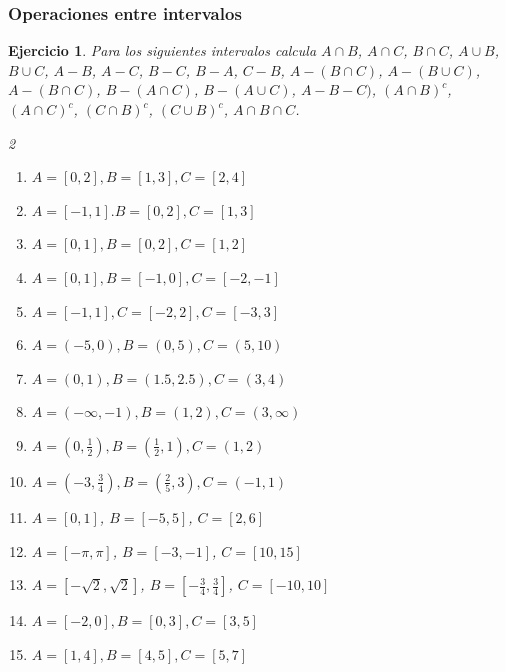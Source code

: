 \documentclass[12pt,twoside]{article}
\newtheorem{Ejer}{Ejercicio}
\begin{document}
\subsubsection*{Operaciones entre intervalos}
\begin{Ejer}
Para los siguientes intervalos calcula $A\cap B$, $A\cap C$, $B\cap C$, $A\cup B$, $B\cup C$, $A-B$, $A-C$, $B-C$, $B-A$, $C-B$, $A-(B\cap C)$, $A-(B\cup C)$, $A-(B\cap C)$, $B-(A\cap C)$, $B-(A\cup C)$, $A-B-C)$, $(A\cap B)^{c}$, $(A\cap C)^{c}$, $(C\cap B)^{c}$, $(C\cup B)^{c}$, $A\cap B \cap C$.
\begin{multicols}{2}
\begin{enumerate}
\item $A= [0,2], B= [1,3], C= [2,4]$

\item $A= [-1,1]. B= [0,2], C= [1,3]$

\item $A= [0,1],B= [0,2],C= [1,2]$

\item $A= [0,1], B= [-1,0], C=[-2,-1]$

\item  $A= [-1,1], C= [-2,2], C=[-3,3]$

\item $A=(-5, 0),B=(0, 5),C=(5, 10)$

\item $A=(0, 1),B=(1.5, 2.5),C=(3, 4)$

\item $A= (-\infty, -1),B=(1, 2),C=(3, \infty)$

\item $A= (0, \frac{1}{2}),B= (\frac{1}{2}, 1), C= (1, 2)$

\item $A= (-3, \frac{3}{4}),B= (\frac{2}{5}, 3), C= (-1, 1)$

\item $A= [0,1]$, $B= [-5,5]$, $C= [2,6]$

\item $A= [-\pi,\pi]$, $B= [-3,-1]$, $C=[10,15]$

\item $A= [-\sqrt{2},\sqrt{2}]$, $B= [-\frac{3}{4},\frac{3}{4}]$, $C=[-10,10]$

\item $A= [-2, 0],B=[0, 3],C= [3, 5]$

\item $A= [1, 4],B=[4, 5],C=[5, 7]$

\end{enumerate}
\end{multicols}
\end{Ejer}
\end{document}
